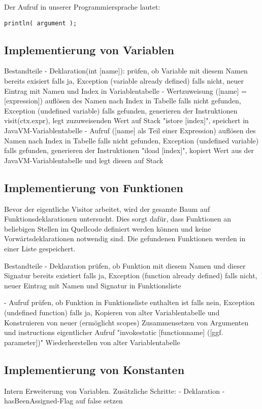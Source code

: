 Der Aufruf in unserer Programmiersprache lautet: 
\begin{lstlisting}[frame=single]
println( argument );
\end{lstlisting}

\subsection{Implementierung von Variablen}
Bestandteile
	-	Deklaration(int [name]):
			prüfen, ob Variable mit diesem Namen bereits exisiert
				falls ja, Exception (variable already defined)
				falls nicht, neuer Eintrag mit Namen und Index in Variablentabelle
	-	Wertzuweisung ([name] = [expression])
			auflösen des Namen nach Index in Tabelle
				falls nicht gefunden, Exception (undefined variable)
				falls gefunden, generieren der Instruktionen
					visit(ctx.expr), legt zuzuweisenden Wert auf Stack
					"istore [index]", speichert in JavaVM-Variablentabelle
	-	Aufruf ([name] als Teil einer Expression)
			auflösen des Namen nach Index in Tabelle
				falls nicht gefunden, Exception (undefined variable)
				falls gefunden, generieren der Instruktionen
					"iload [index]", kopiert Wert aus der JavaVM-Variablentabelle und legt diesen auf Stack


\subsection{Implementierung von Funktionen}
Bevor der eigentliche Visitor arbeitet, wird der gesamte Baum auf Funktionsdeklarationen untersucht. Dies sorgt dafür, dass Funktionen an beliebigen Stellen im Quellcode definiert werden können und keine Vorwärtsdeklarationen notwendig sind. Die gefundenen Funktionen werden in einer Liste gespeichert.

Bestandteile
	-	Deklaration
			prüfen, ob Funktion mit diesem Namen und dieser Signatur bereits existiert
				falls ja, Exception (function already defined)
				falls nicht, neuer Eintrag mit Namen und Signatur in Funktionsliste

	- 	Aufruf			
			prüfen, ob Funktion in Funktionsliste enthalten ist
				falls nein, Exception (undefined function)
				falls ja, 
					Kopieren von alter Variablentabelle und Konstruieren von neuer (ermöglicht scopes)
					Zusammensetzen von Argumenten und instructions
					eigentlicher Aufruf "invokestatic [functionname] ([ggf. parameter])"
					Wiederherstellen von alter Variablentabelle

\subsection{Implementierung von Konstanten}
Intern Erweiterung von Variablen.
Zusätzliche Schritte:
	-	Deklaration
		-	hasBeenAssigned-Flag auf false setzen

